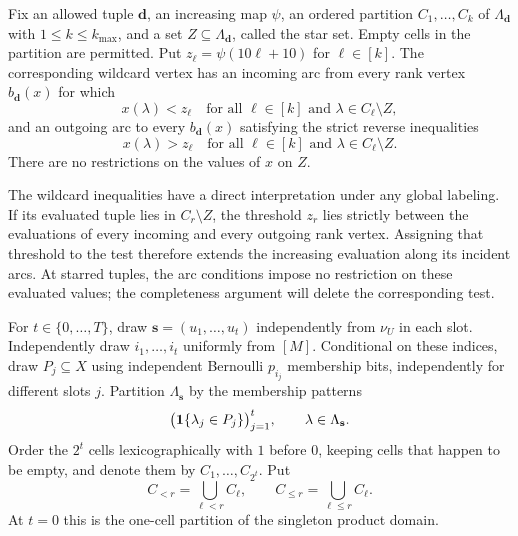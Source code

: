 \begin{definition}
\label{def:wildcard}
Fix an allowed tuple $\mathbf d$, an increasing map $\psi$, an ordered
partition $C_1,\ldots,C_k$ of $\Lambda_{\mathbf d}$ with
$1\le k\le k_{\max}$, and a set $Z\subseteq\Lambda_{\mathbf d}$, called
the star set.  Empty cells in the partition are permitted.  Put
$z_\ell=\psi(10\ell+10)$ for $\ell\in[k]$.  The corresponding wildcard
vertex has an incoming arc from every rank vertex $b_{\mathbf d}(x)$ for
which
\begin{equation}
  x(\lambda)<z_\ell
  \quad\text{for all }\ell\in[k]
  \text{ and }\lambda\in C_\ell\setminus Z,
  \label{eq:wildcard-incoming}
\end{equation}
and an outgoing arc to every $b_{\mathbf d}(x)$ satisfying the strict
reverse inequalities
\begin{equation}
  x(\lambda)>z_\ell
  \quad\text{for all }\ell\in[k]
  \text{ and }\lambda\in C_\ell\setminus Z.
  \label{eq:wildcard-outgoing}
\end{equation}
There are no restrictions on the values of $x$ on $Z$.
\end{definition}

The wildcard inequalities have a direct interpretation under any global
labeling. If its evaluated tuple lies in $C_r\setminus Z$, the threshold
$z_r$ lies strictly between the evaluations of every incoming and every
outgoing rank vertex. Assigning that threshold to the test therefore extends
the increasing evaluation along its incident arcs. At starred tuples, the
arc conditions impose no restriction on these evaluated values; the
completeness argument will delete the corresponding test.

\begin{definition}
\label{def:prefix-data}
For $t\in\{0,\ldots,T\}$, draw
$\mathbf s=(u_1,\ldots,u_t)$ independently from $\nu_U$ in each slot.
Independently draw $i_1,\ldots,i_t$ uniformly from $[M]$.  Conditional on
these indices, draw $P_j\subseteq X$ using independent Bernoulli
$p_{i_j}$ membership bits, independently for different slots $j$.
Partition $\Lambda_{\mathbf s}$ by the membership patterns
\[
  \bigl(\mathbf 1\{\lambda_j\in P_j\}\bigr)_{j=1}^t,
  \qquad \lambda\in\Lambda_{\mathbf s}.
\]
Order the $2^t$ cells lexicographically with $1$ before $0$, keeping cells
that happen to be empty, and denote them by $C_1,\ldots,C_{2^t}$.  Put
\[
  C_{<r}=\bigcup_{\ell<r}C_\ell,
  \qquad C_{\le r}=\bigcup_{\ell\le r}C_\ell.
\]
At $t=0$ this is the one-cell partition of the singleton product domain.
\end{definition}

